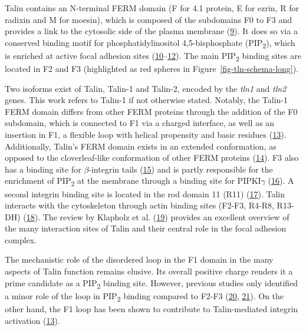 \documentclass[
  twocolumn]{biophys-new-mod}
\begin{document}
Talin contains an N-terminal FERM domain (F for 4.1 protein, E for
ezrin, R for radixin and M for moesin), which is composed of the
subdomains F0 to F3 and provides a link to the cytosolic side of the
plasma membrane
(\protect\hyperlink{ref-chishtiFERMDomainUnique1998}{9}). It does so via
a conserved binding motif for phosphatidylinositol 4,5-bisphosphate
(PIP\textsubscript{2}), which is enriched at active focal adhesion sites
(\protect\hyperlink{ref-maniFERMDomainPhosphoinositide2011}{10}--\protect\hyperlink{ref-songNovelMembranedependentSwitch2012a}{12}).
The main PIP\textsubscript{2} binding sites are located in F2 and F3
(highlighted as red spheres in Figure~\ref{fig-tln-schema-long}).

Two isoforms exist of Talin, Talin-1 and Talin-2, encoded by the
\emph{tln1} and \emph{tln2} genes. This work refers to Talin-1 if not
otherwise stated. Notably, the Talin-1 FERM domain differs from other
FERM proteins through the addition of the F0 subdomain, which is
connected to F1 via a charged interface, as well as an insertion in F1,
a flexible loop with helical propensity and basic residues
(\protect\hyperlink{ref-goultStructureDoubleUbiquitinlike2010}{13}).
Additionally, Talin's FERM domain exists in an extended conformation, as
opposed to the cloverleaf-like conformation of other FERM proteins
(\protect\hyperlink{ref-elliottStructureTalinHead2010}{14}). F3 also has
a binding site for \(\beta\)-integrin tails
(\protect\hyperlink{ref-calderwoodTalinHeadDomain1999}{15}) and is
partly responsible for the enrichment of PIP\textsubscript{2} at the
membrane through a binding site for PIPKI\(\gamma\)
(\protect\hyperlink{ref-calderwoodTalinsKindlinsPartners2013}{16}). A
second integrin binding site is located in the rod domain 11 (R11)
(\protect\hyperlink{ref-horwitzInteractionPlasmaMembrane1986}{17}).
Talin interacts with the cytoskeleton through actin binding sites
(F2-F3, R4-R8, R13-DH)
(\protect\hyperlink{ref-mccannLWEQModuleConserved1997}{18}). The review
by Klapholz et al.
(\protect\hyperlink{ref-klapholzTalinMasterIntegrin2017}{19}) provides
an excellent overview of the many interaction sites of Talin and their
central role in the focal adhesion complex.

The mechanistic role of the disordered loop in the F1 domain in the many
aspects of Talin function remains elusive. Its overall positive charge
renders it a prime candidate as a PIP\textsubscript{2} binding site.
However, previous studies only identified a minor role of the loop in
PIP\textsubscript{2} binding compared to F2-F3
(\protect\hyperlink{ref-chinthalapudiInteractionTalinCell2018a}{20},
\protect\hyperlink{ref-saltelNewPIP22009}{21}). On the other hand, the
F1 loop has been shown to contribute to Talin-mediated integrin
activation
(\protect\hyperlink{ref-goultStructureDoubleUbiquitinlike2010}{13}).
\end{document}
